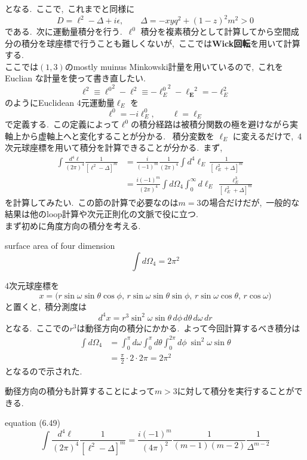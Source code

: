 \documentclass[uplatex,dvipdfmx,a4paper,11pt]{jsarticle}
\begin{document}
となる.~ここで,~これまでと同様に
\[
D=\ell^2-\Delta+i\epsilon,
\qquad
\Delta=-xyq^2+(1-z)^2m^2>0
\]
である.~次に運動量積分を行う.~\(\ell^0\) 積分を複素積分として計算してから空間成分の積分を球座標で行うことも難しくないが,~ここでは\textbf{Wick回転}を用いて計算する.\\
ここでは$(1,3)$のmostly muinus Minkowski計量を用いているので,~これをEuclian な計量を使って書き直したい.~
\[
\ell^2 \equiv {\ell^0}^2 -\boldsymbol{\ell}^2 \equiv - {\ell_E^0}^2-\boldsymbol{\ell_E}^2 = - \ell_E^2
\]
のようにEuclidean 4元運動量\(\ell_E\) を
\[
\ell^0=-i\ell_E^0,
\qquad
\boldsymbol{\ell}=\boldsymbol{\ell}_E
\]
で定義する.~この定義によって$\ell^0$の積分経路は被積分関数の極を避けながら実軸上から虚軸上へと変化することが分かる.~
積分変数を \(\ell_E\) に変えるだけで,~4次元球座標を用いて積分を計算できることが分かる.~まず,~
\[
\begin{aligned}
\int\frac{d^4\ell}{(2\pi)^4}
\frac{1}{[\ell^2-\Delta]^m}
&=
\frac{i}{(-1)^m}\frac{1}{(2\pi)^4}
\int d^4\ell_E\,
\frac{1}{[\ell_E^2+\Delta]^m}
\\
&=
\frac{i(-1)^m}{(2\pi)^4}
\int d\Omega_4
\int_0^\infty d\ell_E\,
\frac{\ell_E^3}{[\ell_E^2+\Delta]^m}
\end{aligned}
\]
を計算してみたい.~この節の計算で必要なのは$m=3$の場合だけだが,~一般的な結果は他のloop計算や次元正則化の文脈で役に立つ.~\\
まず初めに角度方向の積分を考える.
\begin{mylemma}{surface area of four dimension}
  \[
  \int d\Omega_4 = 2\pi^2
  \]
\end{mylemma}
\begin{myproof}
  4次元球座標を
  \[
x=
\bigl(
r\sin\omega\sin\theta\cos\phi,\,
r\sin\omega\sin\theta\sin\phi,\,
r\sin\omega\cos\theta,\,
r\cos\omega
\bigr)
\]
と置くと,~積分測度は
\[
d^4x
=r^3\sin^2\omega\sin\theta\,
d\phi\,d\theta\,d\omega\,dr
\]
となる.~ここでの$r^3$は動径方向の積分にかかる.~よって今回計算するべき積分は
\[
\begin{aligned}
  \int d\Omega_4 &= \int_0^\pi d\omega \int_0^\pi  d\theta \int_0^{2\pi} d\phi ~\sin^2\omega\sin\theta\\
  &= \frac{\pi}{2}\cdot 2\cdot 2\pi = 2\pi^2
\end{aligned}
\]
となるので示された.
\end{myproof}
動径方向の積分も計算することによって$m>3$に対して積分を実行することができる.
\begin{mylemma}{equation (6.49)}
\[
\int\frac{d^4\ell}{(2\pi)^4}
\frac{1}{[\ell^2-\Delta]^m}
=
\frac{i(-1)^m}{(4\pi)^2}
\frac{1}{(m-1)(m-2)}
\frac{1}{\Delta^{m-2}}
\]
\end{mylemma}
\end{document}
